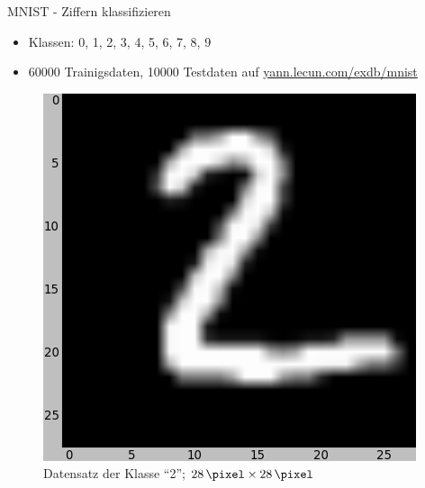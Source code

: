 \begin{frame}{MNIST - Ziffern klassifizieren}
    \begin{minipage}[b]{0.45\linewidth}
        \begin{itemize}
            \item Klassen: 0, 1, 2, 3, 4, 5, 6, 7, 8, 9
            \item \num{60000} Trainigsdaten, \num{10000} Testdaten
                  auf \href{http://yann.lecun.com/exdb/mnist/}{yann.lecun.com/exdb/mnist}
        \end{itemize}
    \end{minipage}
    \hspace{0.5cm}
    \begin{minipage}[b]{0.45\linewidth}
        \begin{figure}
            \centering
            \includegraphics[width=\textwidth]{../presentation-images/mnist-2.png}
            \caption{Datensatz der Klasse \enquote{2}; $\SI{28}{\pixel} \times \SI{28}{\pixel}$}
            \label{fig:spline}
        \end{figure}
    \end{minipage}
\end{frame}


